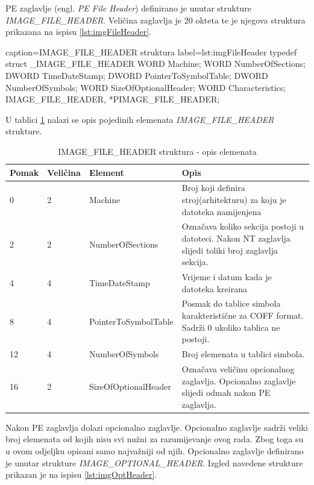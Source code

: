 \documentclass[times, utf8, diplomski, numeric]{fer}
\begin{document}
PE zaglavlje (engl. \emph{PE File Header}) definirano je unutar
strukture \emph{IMAGE\_FILE\_HEADER}. Veličina zaglavlja je 20
okteta te je njegova struktura prikazana na ispisu \ref{lst:imgFileHeader}.

\begin{struktura} {caption=IMAGE\_FILE\_HEADER struktura} {label=lst:imgFileHeader}
typedef struct _IMAGE_FILE_HEADER {
	WORD    Machine;
	WORD    NumberOfSections;
	DWORD   TimeDateStamp;
	DWORD   PointerToSymbolTable;
	DWORD   NumberOfSymbols;
	WORD    SizeOfOptionalHeader;
	WORD    Characteristics;
} IMAGE_FILE_HEADER, *PIMAGE_FILE_HEADER;
\end{struktura}

U tablici \ref{tbl:imgFileHdr} nalazi se opis pojedinih elemenata
\emph{IMAGE\_FILE\_HEADER} strukture.

\pagebreak  %

\begin{table}[htb]
\small
\caption{IMAGE\_FILE\_HEADER struktura - opis elemenata}
\label{tbl:imgFileHdr}
\centering
\begin{tabular}{|l|l|l|p{6cm}|}
\hline
Pomak & Veličina & Element & Opis \\ \hline
0 & 2 & Machine & Broj koji definira stroj(arhitekturu) za koju je datoteka namijenjena \\ \hline
2 & 2 & NumberOfSections & Označava koliko sekcija postoji u datoteci. Nakon NT zaglavlja slijedi toliki broj zaglavlja sekcija. \\ \hline
4 & 4 & TimeDateStamp & Vrijeme i datum kada je datoteka kreirana \\ \hline
8 & 4 & PointerToSymbolTable & Posmak do tablice simbola karakteristične za COFF format. Sadrži 0 ukoliko tablica ne postoji. \\ \hline
12 & 4 & NumberOfSymbols & Broj elemenata u tablici simbola. \\ \hline
16 & 2 & SizeOfOptionalHeader & Označava veličinu opcionalnog zaglavlja. Opcionalno zaglavlje slijedi odmah nakon PE zaglavlja. \\ \hline
\end{tabular}
\end{table}

Nakon PE zaglavlja dolazi opcionalno zaglavlje. Opcionalno
zaglavlje sadrži veliki broj elemenata od kojih nisu svi nužni za
razumijevanje ovog rada. Zbog toga su u ovom odjeljku opisani
samo najvažniji od njih. Opcionalno zaglavlje definirano je
unutar strukture \emph{IMAGE\_OPTIONAL\_HEADER}. Izgled navedene
strukture prikazan je na ispisu \ref{lst:imgOptHeader}.
\end{document}

